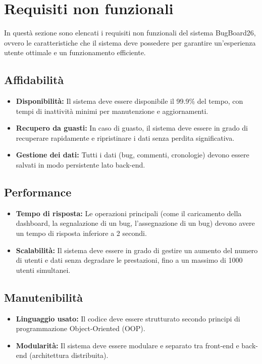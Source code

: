 \section{Requisiti non funzionali}\label{RequisitiNonFunzionali}
In questà sezione sono elencati i requisiti non funzionali del sistema BugBoard26, 
ovvero le caratteristiche che il sistema deve possedere per garantire un'esperienza utente ottimale e un funzionamento efficiente.

\subsection{Affidabilità}
\begin{itemize}
    \item \textbf{Disponibilità:} Il sistema deve essere disponibile il 99.9\% del tempo, con tempi di inattività minimi per manutenzione e aggiornamenti.
    \item \textbf{Recupero da guasti:} In caso di guasto, il sistema deve essere in grado di recuperare rapidamente e ripristinare i dati senza perdita significativa.
    \item \textbf{Gestione dei dati:} Tutti i dati (bug, commenti, cronologie) devono essere salvati in modo persistente lato back-end.
\end{itemize}

\subsection{Performance}
\begin{itemize}
    \item \textbf{Tempo di risposta:} Le operazioni principali (come il caricamento della dashboard, la segnalazione di un bug, l'assegnazione di un bug) devono avere un tempo di risposta inferiore a 2 secondi.
    \item \textbf{Scalabilità:} Il sistema deve essere in grado di gestire un aumento del numero di utenti e dati senza degradare le prestazioni, fino a un massimo di 1000 utenti simultanei.
\end{itemize}

\subsection{Manutenibilità}
\begin{itemize}
    \item \textbf{Linguaggio usato:} Il codice deve essere strutturato secondo principi di programmazione Object-Oriented (OOP).
    \item \textbf{Modularità:} Il sistema deve essere modulare e separato tra front-end e back-end (architettura distribuita).
\end{itemize}

